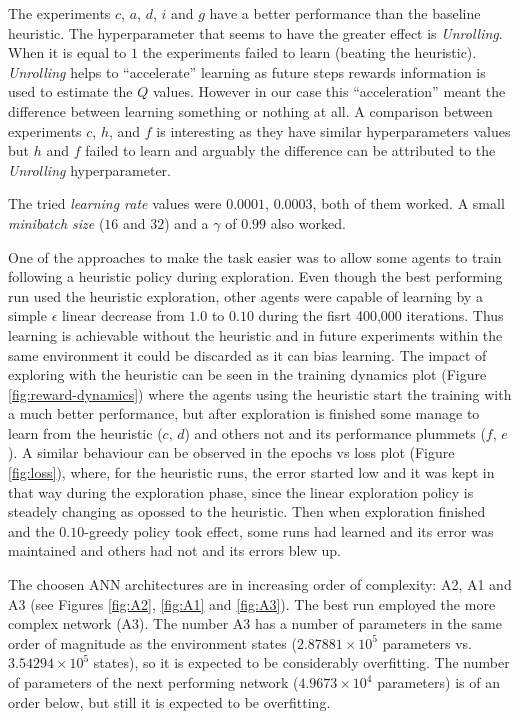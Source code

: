 \documentclass[
  openany]{book}
\begin{document}
The experiments \(c\), \(a\), \(d\), \(i\) and \(g\) have a better performance than the baseline heuristic. The hyperparameter that seems to have the greater effect is \emph{Unrolling}. When it is equal to \(1\) the experiments failed to learn (beating the heuristic). \emph{Unrolling} helps to ``accelerate'' learning as future steps rewards information is used to estimate the \(Q\) values. However in our case this ``acceleration'' meant the difference between learning something or nothing at all. A comparison between experiments \(c\), \(h\), and \(f\) is interesting as they have similar hyperparameters values but \(h\) and \(f\) failed to learn and arguably the difference can be attributed to the \emph{Unrolling} hyperparameter.

The tried \emph{learning rate} values were \(0.0001\), \(0.0003\), both of them worked. A small \emph{minibatch size} (\(16\) and \(32\)) and a \(\gamma\) of \(0.99\) also worked.

One of the approaches to make the task easier was to allow some agents to train following a heuristic policy during exploration. Even though the best performing run used the heuristic exploration, other agents were capable of learning by a simple \(\epsilon\) linear decrease from \(1.0\) to \(0.10\) during the fisrt 400,000 iterations. Thus learning is achievable without the heuristic and in future experiments within the same environment it could be discarded as it can bias learning. The impact of exploring with the heuristic can be seen in the training dynamics plot (Figure \ref{fig:reward-dynamics}) where the agents using the heuristic start the training with a much better performance, but after exploration is finished some manage to learn from the heuristic (\(c\), \(d\)) and others not and its performance plummets (\(f\), \(e\)). A similar behaviour can be observed in the epochs vs loss plot (Figure \ref{fig:loss}), where, for the heuristic runs, the error started low and it was kept in that way during the exploration phase, since the linear exploration policy is steadely changing as opossed to the heuristic. Then when exploration finished and the \(0.10\)-greedy policy took effect, some runs had learned and its error was maintained and others had not and its errors blew up.

The choosen ANN architectures are in increasing order of complexity: A2, A1 and A3 (see Figures \ref{fig:A2}, \ref{fig:A1} and \ref{fig:A3}). The best run employed the more complex network (A3). The number A3 has a number of parameters in the same order of magnitude as the environment states (\ensuremath{2.87881\times 10^{5}} parameters vs.~\ensuremath{3.54294\times 10^{5}} states), so it is expected to be considerably overfitting. The number of parameters of the next performing network (\ensuremath{4.9673\times 10^{4}} parameters) is of an order below, but still it is expected to be overfitting.
\end{document}
